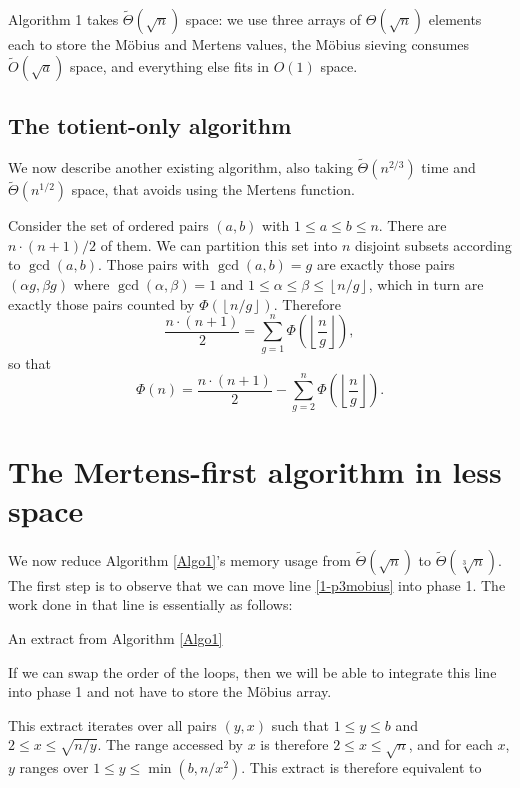 \documentclass[12pt]{article}
\newcommand{\eqn}[1]{\begin{displaymath} #1 \end{displaymath}}
\newcommand{\floor}[1]{{\left\lfloor #1 \right\rfloor}}
\newcommand{\floordiv}[2]{\floor{\frac{#1}{#2}}}
\newcommand{\dfloordiv}[2]{\floor{\dfrac{#1}{#2}}}
\newcommand{\isqrt}[1]{\floor{\sqrt{#1}}}
\newcommand{\softO}[0]{\widetilde{O}}
\newcommand{\softTheta}[0]{\widetilde{\Theta}}
\begin{document}
Algorithm 1 takes $\softTheta(\sqrt{n})$ space: we use three arrays of $\Theta(\sqrt{n})$ elements each to store the M\"{o}bius and Mertens values, the M\"{o}bius sieving consumes $\softO(\sqrt{a})$ space, and everything else fits in $O(1)$ space.

\subsection{The totient-only algorithm}

We now describe another existing algorithm, also taking $\softTheta(n^{2/3})$ time and $\softTheta(n^{1/2})$ space, that avoids using the Mertens function.

Consider the set of ordered pairs $(a,b)$ with $1 \leq a \leq b \leq n$.  There are $n \cdot (n+1) / 2$ of them.  We can partition this set into $n$ disjoint subsets according to $\gcd(a,b)$.  Those pairs with $\gcd(a,b)=g$ are exactly those pairs $(\alpha g, \beta g)$ where $\gcd(\alpha, \beta) = 1$ and $1 \leq \alpha \leq \beta \leq \floor{n/g}$, which in turn are exactly those pairs counted by $\Phi(\floor{n/g})$.  Therefore
\eqn{\frac{n \cdot (n+1)}{2} = \sum_{g=1}^n \Phi\left(\floordiv{n}{g}\right),}
so that
\eqn{\Phi(n) = \frac{n \cdot (n+1)}{2} - \sum_{g=2}^n \Phi\left(\floordiv{n}{g}\right).}
\todo

\section{The Mertens-first algorithm in less space}

We now reduce Algorithm \ref{Algo1}'s memory usage from $\softTheta(\sqrt{n})$ to $\softTheta(\sqrt[3]{n})$.  The first step is to observe that we can move line \ref{1-p3mobius} into phase 1.  The work done in that line is essentially as follows:

\begin{algorithm}[H] \label{Algo1mu}
\DontPrintSemicolon
\caption{An extract from Algorithm \ref{Algo1}}
\Begin{
    \For{$y=b$ \KwTo $1$}{
        \For{$x=2$ \KwTo $\isqrt{n/y}$}{
            $M^\prime_y \gets M^\prime_y - \mu_x \cdot \dfloordiv{n}{yx}$
        }
    }
}
\end{algorithm}

If we can swap the order of the loops, then we will be able to integrate this line into phase 1 and not have to store the M\"{o}bius array.

This extract iterates over all pairs $(y,x)$ such that $1 \leq y \leq b$ and $2 \leq x \leq \sqrt{n/y}$.  The range accessed by $x$ is therefore $2 \leq x \leq \sqrt{n}$, and for each $x$, $y$ ranges over $1 \leq y \leq \min(b, n/x^2)$.  This extract is therefore equivalent to
\end{document}
